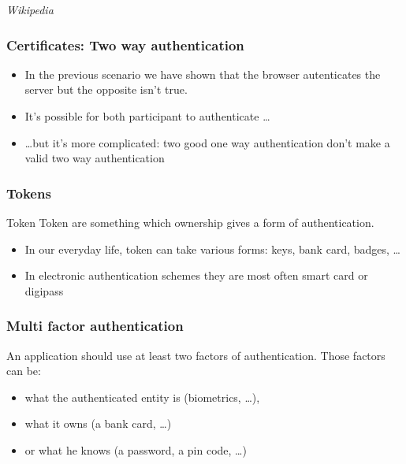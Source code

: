 
\begin{frame}
\end{frame}


\begin{frame}
\textit{Wikipedia}
\end{frame}


\begin{frame}
\frametitle{Certificates: Two way authentication}

\begin{itemize}
\item In the previous scenario we have shown that the browser autenticates
the server but the opposite isn't true.

\item It's possible for both participant to authenticate \ldots

\item \ldots but it's more complicated: two good one way
  authentication don't make a valid two way authentication
\end{itemize}

\end{frame} 


\begin{frame}
\frametitle{Tokens}

\begin{block}{Token} Token are something which ownership gives a form
  of authentication.
\end{block}
\begin{itemize}
\item In our everyday life, token can take various forms: keys, bank card,
badges, \ldots
\item In electronic authentication schemes they are most often smart
  card or digipass
\end{itemize}
\end{frame}


\begin{frame}
\frametitle{Multi factor authentication}
 An application should use at least two factors of
 authentication. Those factors can be:
\begin{itemize}
\item what the authenticated entity is (biometrics, \ldots),
\item what it owns (a bank card, \ldots) 
\item or what he knows (a password, a pin code, \ldots)
\end{itemize}
\end{frame}

